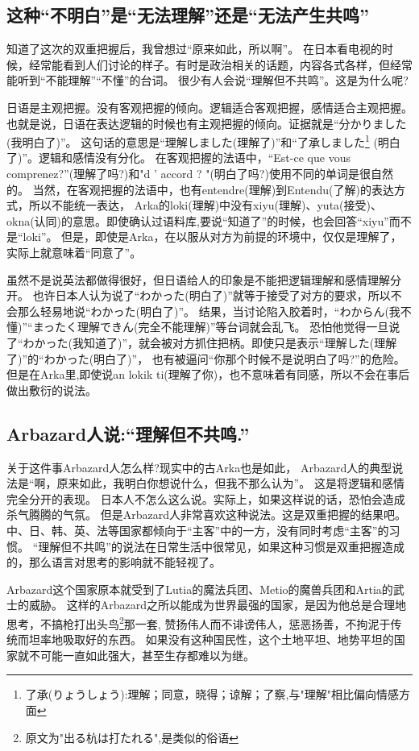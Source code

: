 \subsection{这种``不明白''是``无法理解''还是``无法产生共鸣''}

知道了这次的双重把握后，我曾想过“原来如此，所以啊”。
在日本看电视的时候，经常能看到人们讨论的样子。有时是政治相关的话题，内容各式各样，但经常能听到“不能理解”“不懂”的台词。
很少有人会说“理解但不共鸣”。这是为什么呢?

日语是主观把握。没有客观把握的倾向。逻辑适合客观把握，感情适合主观把握。
也就是说，日语在表达逻辑的时候也有主观把握的倾向。证据就是“分かりました(我明白了)”。
这句话的意思是“理解しました(理解了)”和“了承しました\footnote{了承(りょうしょう):理解；同意，晓得；谅解；了察,与"理解"相比偏向情感方面}
(明白了)”。逻辑和感情没有分化。
在客观把握的法语中，“Est-ce que vous comprenez?”(理解了吗?)和"d ' accord ? "(明白了吗?)使用不同的单词是很自然的。
当然，在客观把握的法语中，也有entendre(理解)到Entendu(了解)的表达方式，所以不能统一表达，
Arka的loki(理解)中没有xiyu(理解)、yuta(接受)、okna(认同)的意思。即使确认过语料库,要说“知道了”的时候，也会回答“xiyu”而不是“loki”。
但是，即使是Arka，在以服从对方为前提的环境中，仅仅是理解了，实际上就意味着“同意了”。

虽然不是说英法都做得很好，但日语给人的印象是不能把逻辑理解和感情理解分开。
也许日本人认为说了“わかった(明白了)”就等于接受了对方的要求，所以不会那么轻易地说“わかった(明白了)”。
结果，当讨论陷入胶着时，“わからん(我不懂)”“まったく理解できん(完全不能理解)”等台词就会乱飞。
恐怕他觉得一旦说了“わかった(我知道了)”，就会被对方抓住把柄。即使只是表示“理解した(理解了)”的“わかった(明白了)”，
也有被逼问“你那个时候不是说明白了吗?”的危险。
但是在Arka里,即使说an lokik ti(理解了你)，也不意味着有同感，所以不会在事后做出敷衍的说法。
\subsection{Arbazard人说:``理解但不共鸣.''}
关于这件事Arbazard人怎么样?现实中的古Arka也是如此，
Arbazard人的典型说法是“啊，原来如此，我明白你想说什么，但我不那么认为”。
这是将逻辑和感情完全分开的表现。
日本人不怎么这么说。实际上，如果这样说的话，恐怕会造成杀气腾腾的气氛。
但是Arbazard人非常喜欢这种说法。这是双重把握的结果吧。
中、日、韩、英、法等国家都倾向于“主客”中的一方，没有同时考虑“主客”的习惯。
“理解但不共鸣”的说法在日常生活中很常见，如果这种习惯是双重把握造成的，那么语言对思考的影响就不能轻视了。

Arbazard这个国家原本就受到了Lutia的魔法兵团、Metio的魔兽兵团和Artia的武士的威胁。
这样的Arbazard之所以能成为世界最强的国家，是因为他总是合理地思考，不搞枪打出头鸟\footnote{原文为"出る杭は打たれる",是类似的俗语}那一套,
赞扬伟人而不诽谤伟人，惩恶扬善，不拘泥于传统而坦率地吸取好的东西。
如果没有这种国民性，这个土地平坦、地势平坦的国家就不可能一直如此强大，甚至生存都难以为继。

